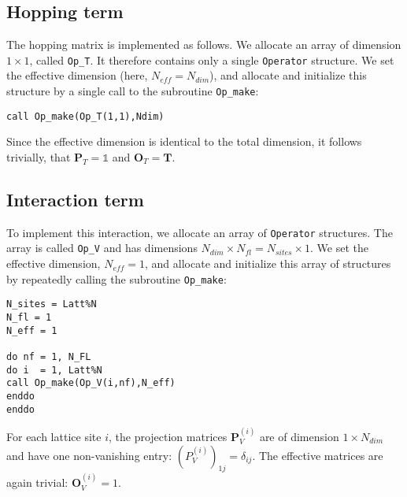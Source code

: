 \subsection{Hopping term}
The hopping matrix is implemented as follows. 
We allocate an array of dimension $1\times 1$, called \texttt{Op\_T}. It therefore contains only a single \texttt{Operator} structure.
We set the effective dimension (here, $N_{eff}=N_{dim}$), and allocate and initialize this structure by a single call to the subroutine \texttt{Op\_make}: 
\begin{verbatim}
call Op_make(Op_T(1,1),Ndim)
\end{verbatim}
Since the effective dimension is identical to the total dimension, it follows trivially, that ${\bm P}_{T}=\mathds{1}$ and ${\bm O}_{T}={\bm T}$. 

\subsection{Interaction term}
To implement this interaction, we allocate an array of \texttt{Operator} structures. The array is called  \texttt{Op\_V} and has dimensions $N_{dim}\times N_{fl}=N_{sites}\times 1$. 
We set the effective dimension, $N_{eff}=1$, and allocate and initialize this array of structures by repeatedly calling the subroutine \texttt{Op\_make}: 
\begin{verbatim}
N_sites = Latt%N
N_fl = 1
N_eff = 1

do nf = 1, N_FL
do i  = 1, Latt%N
call Op_make(Op_V(i,nf),N_eff)
enddo
enddo
\end{verbatim}
For each lattice site $i$, the projection matrices ${\bm P}_{V}^{(i)}$ are of dimension $1\times N_{dim} $ and have one non-vanishing entry: $(P_{V}^{(i)})_{1j}=\delta_{ij}$. 
The effective matrices are again trivial: ${\bm O}_{V}^{(i)}=1$.\\


